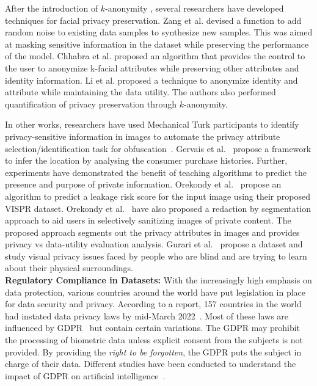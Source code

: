 \documentclass[journal]{IEEEtran}
\begin{document}
After the introduction of $k$-anonymity \cite{sweeney2002k}, several researchers have developed techniques for facial privacy preservation. Zang et al. \cite{zhang2018privacy} devised a function to add random noise to existing data samples to synthesize new samples. This was aimed at masking sensitive information in the dataset while preserving the performance of the model. Chhabra et al. \cite{chhabra2018anonymizing} proposed an algorithm that provides the control to the user to anonymize k-facial attributes while preserving other attributes and identity information. Li et al. \cite{li2019anonymousnet} proposed a technique to anonymize identity and attribute while maintaining the data utility. The authors also performed quantification of privacy preservation through $k$-anonymity. 

In other works, researchers have used Mechanical Turk participants to identify privacy-sensitive information in images to automate the privacy attribute selection/identification task for obfuscation~\cite{li2018human}. Gervais et al.~\cite{gervais2016quantifying} propose a framework to infer the location by analysing the consumer purchase histories. Further, experiments have demonstrated the benefit of teaching algorithms to predict the presence and purpose of private information. Orekondy et al.~\cite{orekondy2017towards} propose an algorithm to predict a leakage risk score for the input image using their proposed VISPR dataset. Orekondy et al.~\cite{orekondy2018connecting} have also proposed a redaction by segmentation approach to aid users in selectively sanitizing images of private content. The proposed approach segments out the privacy attributes in images and provides privacy vs data-utility evaluation analysis. Gurari et al.~\cite{gurari2019vizwiz} propose a dataset and study visual privacy issues faced by people who are blind and are trying to learn about their physical surroundings. \\

\noindent \textbf{Regulatory Compliance in Datasets:} With the increasingly high emphasis on data protection, various countries around the world have put legislation in place for data security and privacy. According to a report, 157 countries in the world had instated data privacy laws by mid-March 2022~\cite{unctad, greenleaf2021global, greenleaf2022now}. Most of these laws are influenced by GDPR~\cite{regulation2016regulation} but contain certain variations.
The GDPR may prohibit the processing of biometric data unless explicit consent from the subjects is not provided. By providing the \textit{right to be forgotten}, the GDPR puts the subject in charge of their data. Different studies have been conducted to understand the impact of GDPR on artificial intelligence~\cite{forti2021deployment, goldsteen2021data}. 
\end{document}
